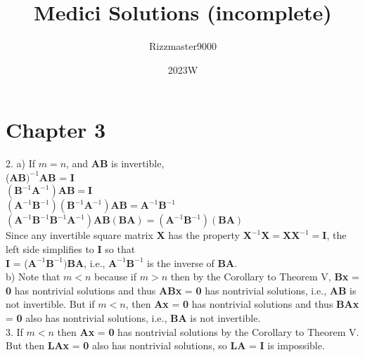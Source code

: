 \documentclass{article}
\title{Medici Solutions (incomplete)}
\author{Rizzmaster9000}
\date{2023W}
\begin{document}
\maketitle
\section*{Chapter 3}
\setlength{\parindent}{0pt}
2. a) If $m = n$, and \textbf{AB} is invertible, \\
($\textbf{AB})^{-1}\textbf{AB}$ = \textbf{I}\\
$(\textbf{B}^{-1}\textbf{A}^{-1})\textbf{AB} = \textbf{I}$\\
$(\textbf{A}^{-1}\textbf{B}^{-1})(\textbf{B}^{-1}\textbf{A}^{-1})\textbf{AB} = \textbf{A}^{-1}\textbf{B}^{-1}$\\
$(\textbf{A}^{-1}\textbf{B}^{-1}\textbf{B}^{-1}\textbf{A}^{-1})\textbf{AB}(\textbf{BA}) = (\textbf{A}^{-1}\textbf{B}^{-1})(\textbf{BA})$\\
Since any invertible square matrix \textbf{X} has the property $\textbf{X}^{-1}\textbf{X} = \textbf{XX}^{-1} = \textbf{I}$,  the left side simplifies to \textbf{I} so that\\ \textbf{I} = ($\textbf{A}^{-1}\textbf{B}^{-1})\textbf{BA}$, i.e., $\textbf{A}^{-1}\textbf{B}^{-1}$ is the inverse of \textbf{BA}.\\
b) Note that $m < n$ because if $m > n$ then by the Corollary to Theorem V, \textbf{Bx} = \textbf{0} has nontrivial solutions and thus \textbf{ABx} = \textbf{0} has nontrivial solutions, i.e., \textbf{AB} is not invertible. But if $m < n$, then \textbf{Ax} = \textbf{0} has nontrivial solutions and thus \textbf{BAx} = \textbf{0} also has nontrivial solutions, i.e., \textbf{BA} is not invertible.\\

3. If  $m < n$ then \textbf{Ax} = \textbf{0} has nontrivial solutions by the Corollary to Theorem V. But then \textbf{LAx} = \textbf{0} also has nontrivial solutions, so \textbf{LA} = \textbf{I} is impossible.\\
\end{document}
